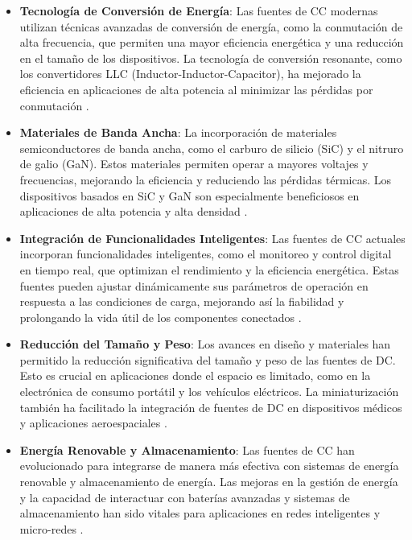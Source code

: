 \begin{itemize}
    \item \textbf{Tecnología de Conversión de Energía}: Las fuentes de CC modernas utilizan técnicas avanzadas de conversión de energía, como la conmutación de alta frecuencia, que permiten una mayor eficiencia energética y una reducción en el tamaño de los dispositivos. La tecnología de conversión resonante, como los convertidores LLC (Inductor-Inductor-Capacitor), ha mejorado la eficiencia en aplicaciones de alta potencia al minimizar las pérdidas por conmutación \cite{zhang2013}.
    \item \textbf{Materiales de Banda Ancha}: La incorporación de materiales semiconductores de banda ancha, como el carburo de silicio (SiC) y el nitruro de galio (GaN). Estos materiales permiten operar a mayores voltajes y frecuencias, mejorando la eficiencia y reduciendo las pérdidas térmicas. Los dispositivos basados en SiC y GaN son especialmente beneficiosos en aplicaciones de alta potencia y alta densidad \cite{palmour2019}.
    \item \textbf{Integración de Funcionalidades Inteligentes}: Las fuentes de CC actuales incorporan funcionalidades inteligentes, como el monitoreo y control digital en tiempo real, que optimizan el rendimiento y la eficiencia energética. Estas fuentes pueden ajustar dinámicamente sus parámetros de operación en respuesta a las condiciones de carga, mejorando así la fiabilidad y prolongando la vida útil de los componentes conectados \cite{brown2020}.
    \item \textbf{Reducción del Tamaño y Peso}: Los avances en diseño y materiales han permitido la reducción significativa del tamaño y peso de las fuentes de DC. Esto es crucial en aplicaciones donde el espacio es limitado, como en la electrónica de consumo portátil y los vehículos eléctricos. La miniaturización también ha facilitado la integración de fuentes de DC en dispositivos médicos y aplicaciones aeroespaciales \cite{kumar2017}.
    \item \textbf{Energía Renovable y Almacenamiento}: Las fuentes de CC han evolucionado para integrarse de manera más efectiva con sistemas de energía renovable y almacenamiento de energía. Las mejoras en la gestión de energía y la capacidad de interactuar con baterías avanzadas y sistemas de almacenamiento han sido vitales para aplicaciones en redes inteligentes y micro-redes \cite{hoffmann2021}.
\end{itemize}\par 
